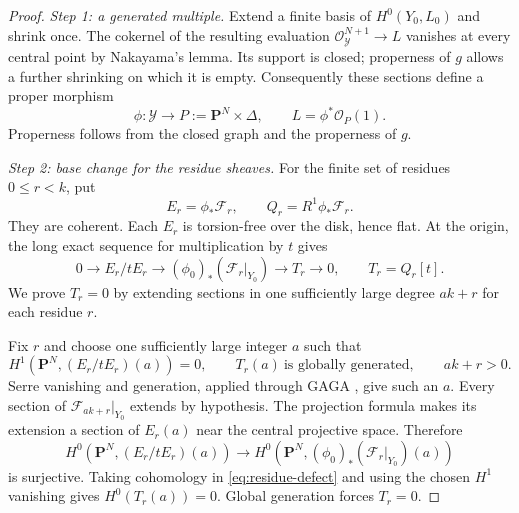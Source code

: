\documentclass[11pt,a4paper]{article}
\numberwithin{equation}{section}
\theoremstyle{definition}
\theoremstyle{remark}
\newcommand{\PP}{\mathbf P}\newcommand{\HH}{\mathbb H}
\newcommand{\OO}{\mathcal O}\newcommand{\cX}{\mathcal X}
\begin{document}
\begin{proof}
\emph{Step 1: a generated multiple.}
Extend a finite basis of $H^0(Y_0,L_0)$ and shrink once. The cokernel
of the resulting evaluation $\OO_{\mathcal Y}^{N+1}\to L$ vanishes
at every central point by Nakayama's lemma. Its support is closed;
properness of $g$ allows a further shrinking on which it is empty.
Consequently these sections define a proper morphism
\[
 \phi:\mathcal Y\longrightarrow P:=\PP^N\times\Delta,
 \qquad L=\phi^*\OO_P(1).
\]
Properness follows from the closed graph and the properness of $g$.

\smallskip\noindent\emph{Step 2: base change for the residue sheaves.}
For the finite set of residues $0\le r<k$, put
\[
 E_r=\phi_*\mathcal F_r,\qquad Q_r=R^1\phi_*\mathcal F_r.
\]
They are coherent. Each $E_r$ is torsion-free over the disk, hence flat.
At the origin, the long exact sequence for multiplication by $t$ gives
\begin{equation}\label{eq:residue-defect}
 0\longrightarrow E_r/tE_r
 \longrightarrow (\phi_0)_*(\mathcal F_r|_{Y_0})
 \longrightarrow T_r\longrightarrow0,
 \qquad T_r=Q_r[t].
\end{equation}
We prove $T_r=0$ by extending sections in one sufficiently large
degree $ak+r$ for each residue $r$.

Fix $r$ and choose one sufficiently large integer $a$ such that
\[
 H^1(\PP^N,(E_r/tE_r)(a))=0,
 \qquad T_r(a)\ \text{is globally generated},\qquad ak+r>0.
\]
Serre vanishing and generation, applied through GAGA
\cite{Serre1956}, give such an $a$. Every section of
$\mathcal F_{ak+r}|_{Y_0}$ extends by hypothesis. The projection
formula makes its extension a section of $E_r(a)$ near the central
projective space. Therefore
\[
 H^0(\PP^N,(E_r/tE_r)(a))
 \longrightarrow
 H^0(\PP^N,(\phi_0)_*(\mathcal F_r|_{Y_0})(a))
\]
is surjective. Taking cohomology in \eqref{eq:residue-defect} and
using the chosen $H^1$ vanishing gives $H^0(T_r(a))=0$.
Global generation forces $T_r=0$.


\end{proof}
\end{document}
